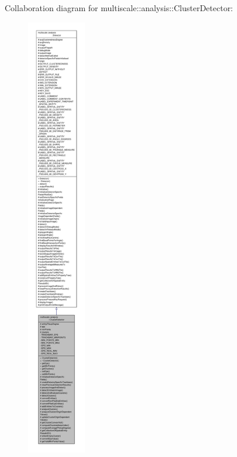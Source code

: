 Collaboration diagram for multiscale\-:\-:analysis\-:\-:Cluster\-Detector\-:
\nopagebreak
\begin{figure}[H]
\begin{center}
\leavevmode
\includegraphics[height=550pt]{classmultiscale_1_1analysis_1_1ClusterDetector__coll__graph}
\end{center}
\end{figure}
